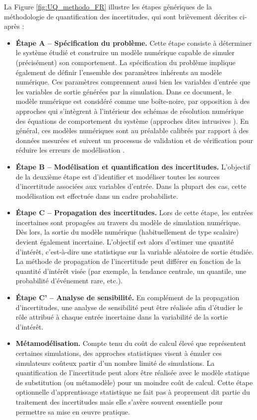 La Figure \ref{fig:UQ_methodo_FR} illustre les étapes génériques de la méthodologie de quantification des incertitudes, qui sont brièvement décrites ci-après :
\begin{itemize}
    \item[\textbullet] \textbf{\'Etape A -- Spécification du problème.} 
    Cette étape consiste à déterminer le système étudié et construire un modèle numérique capable de simuler (précisément) son comportement. 
    La spécification du problème implique également de définir l'ensemble des paramètres inhérents au modèle numérique. 
    Ces paramètres comprennent aussi bien les variables d'entrée que les variables de sortie générées par la simulation. 
    Dans ce document, le modèle numérique est considéré comme une boîte-noire, par opposition à des approches qui s'intègrent à l'intérieur des schémas de résolution numérique des équations de comportement du système (approches dites intrusives \citep{lemaitre_2010}). 
    En général, ces modèles numériques sont au préalable calibrés par rapport à des données mesurées et suivent un processus de validation et de vérification pour réduire les erreurs de modélisation \citep{oberkampf_2010_VVUQ}.
    \item[\textbullet] \textbf{\'Etape B -- Modélisation et quantification des incertitudes.} 
    L'objectif de la deuxième étape est d'identifier et modéliser toutes les sources d'incertitude associées aux variables d'entrée. 
    Dans la plupart des cas, cette modélisation est effectuée dans un cadre probabiliste.
    \item[\textbullet] \textbf{\'Etape C -- Propagation des incertitudes.} 
    Lors de cette étape, les entrées incertaines sont propagées au travers du modèle de simulation numérique. 
    Dès lors, la sortie du modèle numérique (habituellement de type scalaire) devient également incertaine. 
    L'objectif est alors d'estimer une quantité d'intérêt, c'est-à-dire une statistique sur la variable aléatoire de sortie étudiée. 
    La méthode de propagation de l'incertitude peut différer en fonction de la quantité d'intérêt visée (par exemple, la tendance centrale, un quantile, une probabilité d'événement rare, etc.). 
    \item[\textbullet] \textbf{\'Etape C' -- Analyse de sensibilité.} 
    En complément de la propagation d'incertitudes, une analyse de sensibilité peut être réalisée afin d'étudier le rôle attribué à chaque entrée incertaine dans la variabilité de la sortie d'intérêt.
    \item[\textbullet] \textbf{Métamodélisation.} 
    Compte tenu du coût de calcul élevé que représentent certaines simulations, des approches statistiques visent à émuler ces simulateurs coûteux partir d'un nombre limité de simulations. 
    La quantification de l'incertitude peut alors être réalisée avec le modèle statique de substitution (ou métamodèle) pour un moindre coût de calcul. 
    Cette étape optionnelle d'apprentissage statistique ne fait pas à proprement dit partie du traitement des incertitudes mais elle s'avère souvent essentielle pour permettre sa mise en \oe uvre pratique. 
\end{itemize}

